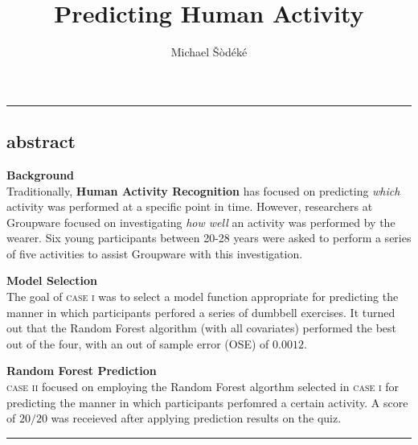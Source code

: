 \documentclass[10pt, twoside]{article}
\title{Predicting Human Activity}
\author{Michael Šòdéké}
\date{\vspace{-14ex}}
\begin{document}
\maketitle

\noindent\rule[-2.0\baselineskip]{\linewidth}{0.1pt}
\vspace{-3ex}
\begin{center}
\subsection{abstract}
\vspace{-3ex}
\end{center}

\noindent
\textbf{Background} \\
Traditionally, \textbf{Human Activity Recognition} has focused on predicting \emph{which} activity was
performed at a specific point in time. However, researchers at Groupware focused on
investigating \emph{how well} an activity was performed by the wearer. Six young participants
between 20-28 years were asked to perform a series of five activities to assist Groupware
with this investigation.
\smallskip

\noindent
\textbf{Model Selection} \\
The goal of \textsc{case i} was to select a model function appropriate for predicting the manner in
which participants perfored a series of dumbbell exercises. It turned out that the Random Forest
algorithm (with all covariates) performed the best out of the four, with an out of sample error
(OSE) of $0.0012$.
\smallskip

\noindent
\textbf{Random Forest Prediction} \\
\textsc{case ii} focused on employing the Random Forest algorthm selected in \textsc{case i} for predicting
the manner in which participants perfomred a certain activity. A score of $20/20$ was receieved after
applying prediction results on the quiz.
\smallskip

\vspace{-5.5ex}
\noindent\rule[-2.0\baselineskip]{\linewidth}{0.1pt}
\end{document}
